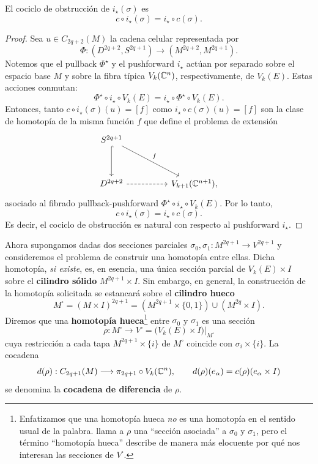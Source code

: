 \begin{proposition}[Estabilidad]
El cociclo de obstrucción de $i_\star(\sigma)$ es
$$c \circ i_\star(\sigma) = i_\star \circ c(\sigma).$$
\end{proposition}

\begin{proof}
Sea $u \in C_{2q+2}(M)$ la cadena celular representada por
$$\Phi : (D^{2q+2}, S^{2q+1}) \longrightarrow (M^{2q+2}, M^{2q+1}).$$
Notemos que el pullback $\Phi^\star$ y el pushforward $i_\star$ actúan por separado sobre el espacio base $M$ y sobre la fibra típica $V_k(\mathbb C^n)$, respectivamente, de $V_k(E)$. Estas acciones conmutan:
$$\Phi^\star \circ i_\star \circ V_k(E) = i_\star \circ \Phi^\star \circ V_k(E).$$
Entonces, tanto $c \circ i_\star(\sigma)(u) = [f]$ como $i_\star \circ c(\sigma)(u) = [f]$ son la clase de homotopía de la misma función $f$ que define el problema de extensión
$$
\begin{tikzcd}[row sep = huge, column sep = huge]
    S^{2q+1} \arrow[d, hook] \arrow[rd, "f"] \\
    D^{2q+2} \arrow[r, dashed] & V_{k+1}(\C^{n+1}),
\end{tikzcd}
$$
asociado al fibrado pullback-pushforward $\Phi^\star \circ i_\star \circ V_k(E)$. Por lo tanto,
$$c \circ i_\star(\sigma) = i_\star \circ c(\sigma).$$
Es decir, el cociclo de obstrucción es natural con respecto al pushforward $i_\star$.
\end{proof}

Ahora supongamos dadas dos secciones parciales $\sigma_0, \sigma_1 : M^{2q+1} \to V^{2q+1}$ y consideremos el problema de construir una homotopía entre ellas. Dicha homotopía, \textit{si existe}, es, en esencia, una única sección parcial de $V_k(E) \times I$ sobre el \textbf{cilindro sólido} $M^{2q+1} \times I$. Sin embargo, en general, la construcción de la homotopía solicitada se estancará sobre el \textbf{cilindro hueco}
$$
M^\square
    = (M \times I)^{2q+1}
    = (M^{2q+1} \times \{ 0, 1 \}) \cup (M^{2q} \times I).
$$
Diremos que una \textbf{homotopía hueca}\footnote{Enfatizamos que una homotopía hueca \textit{no} es una homotopía en el sentido usual de la palabra. \cite[p. 171]{steenrod} llama a $\rho$ una ``sección asociada'' a $\sigma_0$ y $\sigma_1$, pero el término ``homotopía hueca'' describe de manera más elocuente por qué nos interesan las secciones de $V^\square$.} entre $\sigma_0$ y $\sigma_1$ es una sección$$\rho : M^\square \longrightarrow V^\square = \big( V_k(E) \times I \big) \Big \vert_{M^\square}$$
cuya restricción a cada tapa $M^{2q+1} \times \{ i \}$ de $M^\square$ coincide con $\sigma_i \times \{ i \}$. La cocadena
$$
d(\rho) : C_{2q+1}(M) \longrightarrow \pi_{2q+1} \circ V_k(\mathbb C^n), \qquad
d(\rho)(e_\alpha) = c(\rho)(e_\alpha \times I)
$$
se denomina la \textbf{cocadena de diferencia} de $\rho$.

